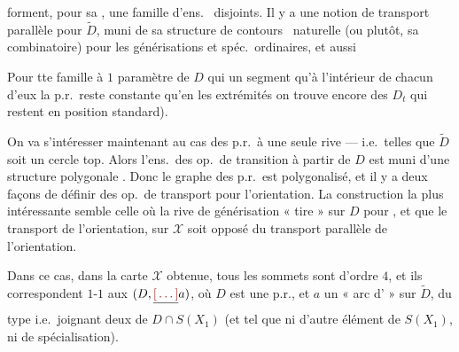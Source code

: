 \documentclass[11pt,a4paper]{article}
\begin{document}
forment, pour sa , une famille d'ens.\ \struck{\ill{}}  disjoints. Il y a une notion de transport parallèle pour $\widetilde{D}$, muni de sa structure de \struck{\ill{}} contours \ naturelle (ou plutôt, sa  combinatoire) pour les générisations et spéc.\ ordinaires, et aussi


Pour tte famille à $1$ paramètre de $D$ qui  un segment  qu'à l'intérieur de chacun d'eux la p.r.\ reste constante   qu'en les extrémités on trouve encore des $D_t$ qui restent  en position standard).

On va s'intéresser maintenant au cas des p.r.\ à une seule rive --- i.e.\ telles que $\widetilde{D}$ soit un cercle top. Alors l'ens.\ des op.\ de transition à partir de $D$ est muni d'une structure polygonale . Donc le graphe  des p.r.\ est polygonalisé, et \struck{\ill{}} il y a deux façons de définir des op.\ de transport pour l'orientation. La construction la plus intéressante semble celle où la rive de générisation « tire » sur $D$ pour , et que le transport de l'orientation, sur $\mathcal{X}$ soit opposé du transport parallèle de l'orientation.

Dans ce cas, dans la carte $\mathcal{X}$ obtenue, tous les sommets sont d'ordre $4$, et ils correspondent \struck{\ill{}} $1$-$1$ aux  $(D, \struck{\ill{}} a)$, où $D$ est une p.r., et $a$ un « arc d' » sur $\widetilde{D}$, du type  i.e.\ joignant deux   de $D \cap S(X_1)$ (et tel que  ni d'autre élément de $S(X_1)$, ni  de spécialisation).
\end{document}
